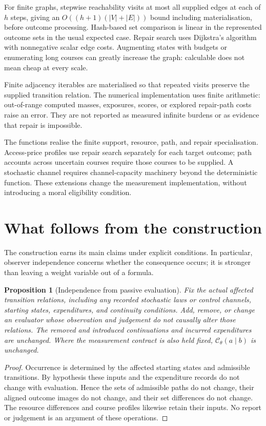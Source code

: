 \documentclass[11pt,a4paper]{article}
\newtheorem{proposition}[definition]{Proposition}
\theoremstyle{remark}
\newcommand{\C}{\mathcal C}
\begin{document}
For finite graphs, stepwise reachability visits at most all supplied edges at
each of $h$ steps, giving an $O((h+1)(|V|+|E|))$ bound including materialisation, before
outcome processing.
Hash-based set comparison is linear in the represented outcome sets in the
usual expected case. Repair search uses Dijkstra's algorithm with nonnegative
scalar edge costs. Augmenting states with budgets or enumerating long courses
can greatly increase the graph: calculable does not mean cheap at every scale.

Finite adjacency iterables are materialised so that repeated visits preserve
the supplied transition relation. The numerical implementation uses finite
arithmetic: out-of-range computed masses, exposures, scores, or explored
repair-path costs raise an error. They are not reported as measured infinite
burdens or as evidence that repair is impossible.

The functions realise the finite support, resource, path, and repair
specialisation. Access-price profiles use repair
search separately for each target outcome; path accounts across uncertain
courses require those courses to be supplied. A stochastic channel requires
channel-capacity machinery beyond the deterministic function. These extensions
change the measurement implementation, without introducing a moral eligibility
condition.

\section{What follows from the construction}\label{sec:results}

The construction earns its main claims under explicit conditions. In particular,
observer independence concerns whether the consequence occurs; it is stronger
than leaving a weight variable out of a formula.

\begin{proposition}[Independence from passive evaluation]\label{prop:observer}
Fix the actual affected transition relations, including any recorded stochastic
laws or control channels, starting states, expenditures,
and continuity conditions. Add, remove, or change an evaluator whose observation
and judgement do not causally alter those relations. The removed and introduced
continuations and incurred expenditures are unchanged. Where the measurement
contract is also held fixed, $\C_\theta(a\mid b)$ is unchanged.
\end{proposition}
\begin{proof}
Occurrence is determined by the affected starting states and admissible
transitions. By hypothesis these inputs and the expenditure records do not
change with evaluation. Hence the sets of admissible paths do not change,
their aligned outcome images do not change, and their set differences do not
change. The resource differences and course profiles likewise retain their
inputs. No report or judgement is an argument of these operations.
\end{proof}
\end{document}
